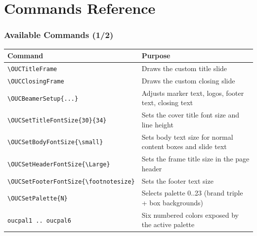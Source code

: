 \documentclass[aspectratio=169,10pt]{beamer}
\begin{document}
\section{Commands Reference}

\begin{frame}
    \frametitle{Available Commands (1/2)}
    \renewcommand{\arraystretch}{1.2}
    \centering
    \scriptsize
    \begin{tabular}{@{}>{\columncolor{paleblue}}p{} p{}@{}}
        \toprule
        \rowcolor{primary}
        {\color{white}\bfseries Command} & {\color{white}\bfseries Purpose} \\
        \midrule
        \texttt{\textbackslash OUCTitleFrame} & Draws the custom title slide \\
        \texttt{\textbackslash OUCClosingFrame} & Draws the custom closing slide \\
        \texttt{\textbackslash OUCBeamerSetup\{...\}} & Adjusts marker text, logos, footer text, closing text \\
        \texttt{\textbackslash OUCSetTitleFontSize\{30\}\{34\}} & Sets the cover title font size and line height \\
        \texttt{\textbackslash OUCSetBodyFontSize\{\textbackslash small\}} & Sets body text size for normal content boxes and slide text \\
        \texttt{\textbackslash OUCSetHeaderFontSize\{\textbackslash Large\}} & Sets the frame title size in the page header \\
        \texttt{\textbackslash OUCSetFooterFontSize\{\textbackslash footnotesize\}} & Sets the footer text size \\
        \texttt{\textbackslash OUCSetPalette\{N\}} & Selects palette 0..23 (brand triple + box backgrounds) \\
        \texttt{oucpal1 .. oucpal6} & Six numbered colors exposed by the active palette \\
        \bottomrule
    \end{tabular}
\end{frame}
\end{document}
